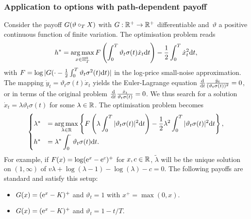 \subsubsection{\textbf{Application to options with path-dependent payoff}}
\label{ex:BSPathDep}
Consider the payoff $G(\vartheta\circ_{T}\nobreak X)$ with $G:\mathbb{R}^+ \to \mathbb{R}^+$ differentiable and~$\vartheta$ 
a positive continuous function of finite variation. 
The optimisation problem reads
$$
h^{*} = \operatorname*{arg\,max}\limits_{x \in \mathbb{H}_T^0} F\left(\int_0^T \vartheta_t \sigma(t) \dot{x}_t \mathrm{d} t\right) - \frac{1}{2}\int_0^T \dot{x}_t^2 \mathrm{d} t,
$$
with %
$F = \log|G(\cdot - \frac{1}{2}\int_0^T\vartheta_t \sigma^2(t) \mathrm{d} t)|$ in the log-price small-noise approximation. 
The mapping $\dot{y}_t = \vartheta_t\sigma(t)\dot{x}_t$
yields the Euler-Lagrange equation
$
\frac{\mathrm{d}}{\mathrm{d} t}\frac{\dot{y}_t}{(\vartheta_t\sigma(t))^2} = 0$,
or in terms of the original problem
$\frac{\mathrm{d}}{\mathrm{d} t}\frac{\dot{x}_t}{\vartheta_t\sigma(t)} = 0$.
We thus search for a solution $\dot{x}_t = \lambda \vartheta_t\sigma(t)$ for some $\lambda \in\mathbb{R}$. 
The optimisation problem becomes
\[
\begin{cases}
\lambda^{*} &= \displaystyle \operatorname*{arg\,max}\limits_{\lambda \in\mathbb{R}}
\left\{F\left(\lambda \int_0^T |\vartheta_t \sigma(t)|^2 \mathrm{d} t\right)  - \frac{1}{2}\lambda^2 \int_0^T |\vartheta_t \sigma(t)|^2 \mathrm{d} t\right\},\\
h^{*} &= \displaystyle \lambda^{*} \int_0^\cdot \vartheta_t \sigma(t) \mathrm{d} t.
\end{cases}
\]
For example, if $F(x) = \log(\mathrm{e}^x - \mathrm{e}^c)^+$ for $x,c \in\mathbb{R}$, $\widetilde{\lambda}$ will be the unique solution on $(1,\infty)$ of
$v\lambda + \log(\lambda - 1) - \log(\lambda) - c = 0$.
The following payoffs are standard
and satisfy this setup:
\begin{itemize}
\item {} $G(x) = (\mathrm{e}^{x} - K)^+$ and $\vartheta_t=1$ with $x^+ = \max(0,x)$. 
\item {} $G(x) = (\mathrm{e}^{x} - K)^+$ and $\vartheta_t=1 - t/T$. 
\end{itemize}

